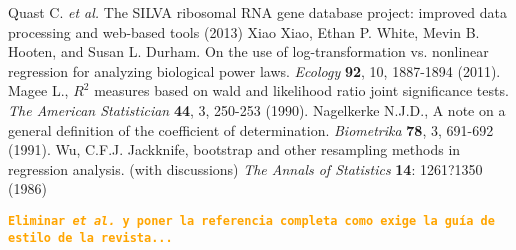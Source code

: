 \documentclass[12pt,oneside,letterpaper]{article}
\newcommand{\todo}[1]{\texttt{\bfseries\textcolor{Orange}{#1}}}
\begin{document}
\begin{thebibliography}{99}
	 Quast C.  \textit{et al.} The SILVA ribosomal RNA gene database project: improved data processing and web-based tools (2013)
 	 Xiao Xiao, Ethan P. White, Mevin B. Hooten, and Susan L. Durham. On the use of log-transformation vs. nonlinear regression for analyzing biological power laws. {\it Ecology} {\bf 92}, 10, 1887-1894 (2011).
 	 Magee L., $R^2$ measures based on wald and likelihood ratio joint significance tests. {\it The American Statistician} {\bf 44}, 3, 250-253 (1990).
	 Nagelkerke N.J.D., A note on a general definition of the coefficient of determination. {\it Biometrika} {\bf 78}, 3, 691-692 (1991).
	 Wu, C.F.J. Jackknife, bootstrap and other resampling methods in regression analysis. (with discussions) \textit{The Annals of Statistics} {\bf 14}: 1261?1350 (1986)
\end{thebibliography}
\todo{Eliminar \textit{et al.} y poner la referencia completa como exige la guía de estilo de la revista...}
\end{document}
